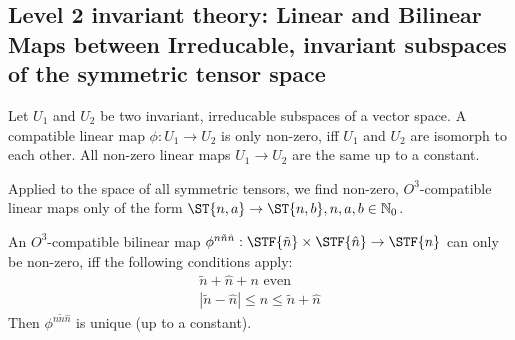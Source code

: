 \subsection{Level 2 invariant theory: Linear and Bilinear Maps between Irreducable, invariant subspaces of the symmetric tensor space}
\begin{lemma}
	Let $U_1$ and $U_2$ be two invariant, irreducable subspaces of a vector space. A compatible linear map $\phi: U_1 \to U_2$ is only non-zero, iff $U_1$ and $U_2$ are isomorph to each other. All non-zero linear maps $U_1 \to U_2$ are the same up to a constant.
\end{lemma}
Applied to the space of all symmetric tensors, we find non-zero, $O^3$-compatible linear maps only of the form $\ST{n,a}\to\ST{n,b}, n,a,b \in \IN_0$.
\begin{lemma}
	An $O^3$-compatible bilinear map $\phi^{n\tilde{n}\hat{n}}: \STF{\tilde{n}}\times\STF{\hat{n}}\to\STF{n}$ can only be non-zero, iff the following conditions apply:
	\begin{align*}
		\tilde{n}+\hat{n} + n \text{ even}\\
		|\tilde{n}-\hat{n}|\leq n\leq \tilde{n}+\hat{n}
	\end{align*}
	Then $\phi^{n\tilde{n}\hat{n}}$ is unique (up to a constant).
\end{lemma}
